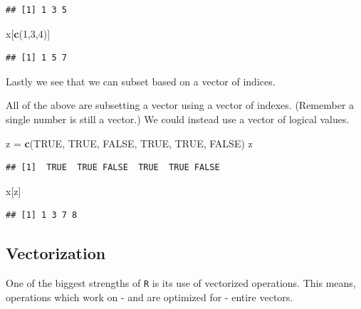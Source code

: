 \documentclass[]{book}
\newenvironment{Shaded}{\begin{snugshade}}{\end{snugshade}}
\newcommand{\KeywordTok}[1]{\textcolor[rgb]{0.13,0.29,0.53}{\textbf{#1}}}
\newcommand{\DecValTok}[1]{\textcolor[rgb]{0.00,0.00,0.81}{#1}}
\newcommand{\StringTok}[1]{\textcolor[rgb]{0.31,0.60,0.02}{#1}}
\newcommand{\OtherTok}[1]{\textcolor[rgb]{0.56,0.35,0.01}{#1}}
\newcommand{\NormalTok}[1]{#1}
\theoremstyle{definition}
\theoremstyle{definition}
\theoremstyle{definition}
\theoremstyle{remark}
\begin{document}
\begin{verbatim}
## [1] 1 3 5
\end{verbatim}

\begin{Shaded}
\begin{Highlighting}[]
\NormalTok{x[}\KeywordTok{c}\NormalTok{(}\DecValTok{1}\NormalTok{,}\DecValTok{3}\NormalTok{,}\DecValTok{4}\NormalTok{)]}
\end{Highlighting}
\end{Shaded}

\begin{verbatim}
## [1] 1 5 7
\end{verbatim}

Lastly we see that we can subset based on a vector of indices.

All of the above are subsetting a vector using a vector of indexes.
(Remember a single number is still a vector.) We could instead use a
vector of logical values.

\begin{Shaded}
\begin{Highlighting}[]
\NormalTok{z =}\StringTok{ }\KeywordTok{c}\NormalTok{(}\OtherTok{TRUE}\NormalTok{, }\OtherTok{TRUE}\NormalTok{, }\OtherTok{FALSE}\NormalTok{, }\OtherTok{TRUE}\NormalTok{, }\OtherTok{TRUE}\NormalTok{, }\OtherTok{FALSE}\NormalTok{)}
\NormalTok{z}
\end{Highlighting}
\end{Shaded}

\begin{verbatim}
## [1]  TRUE  TRUE FALSE  TRUE  TRUE FALSE
\end{verbatim}

\begin{Shaded}
\begin{Highlighting}[]
\NormalTok{x[z]}
\end{Highlighting}
\end{Shaded}

\begin{verbatim}
## [1] 1 3 7 8
\end{verbatim}

\subsection{Vectorization}\label{vectorization}

One of the biggest strengths of \texttt{R} is its use of vectorized
operations. This means, operations which work on - and are optimized for
- entire vectors.
\end{document}
